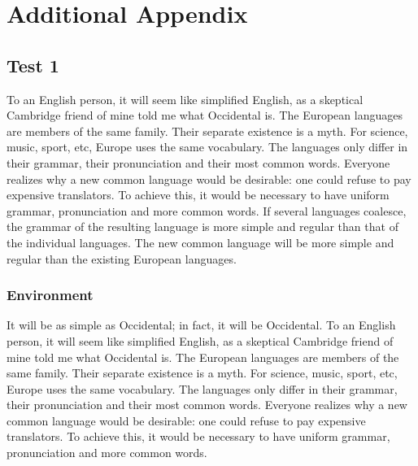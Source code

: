 \chapter{Additional Appendix}
\label{chap:appendix_B}

\section{Test 1}
To an English person, it will seem like simplified English, as a skeptical Cambridge friend of mine told me what Occidental is. The European languages are members of the same family. Their separate existence is a myth. For science, music, sport, etc, Europe uses the same vocabulary. The languages only differ in their grammar, their pronunciation and their most common words. Everyone realizes why a new common language would be desirable: one could refuse to pay expensive translators. To achieve this, it would be necessary to have uniform grammar, pronunciation and more common words. If several languages coalesce, the grammar of the resulting language is more simple and regular than that of the individual languages. The new common language will be more simple and regular than the existing European languages. 

\subsection{Environment}
It will be as simple as Occidental; in fact, it will be Occidental. To an English person, it will seem like simplified English, as a skeptical Cambridge friend of mine told me what Occidental is. The European languages are members of the same family. Their separate existence is a myth. For science, music, sport, etc, Europe uses the same vocabulary. The languages only differ in their grammar, their pronunciation and their most common words. Everyone realizes why a new common language would be desirable: one could refuse to pay expensive translators. To achieve this, it would be necessary to have uniform grammar, pronunciation and more common words.